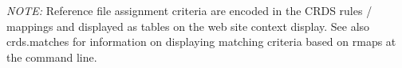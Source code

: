 \documentclass[letterpaper,10pt,english]{sphinxmanual}
\begin{document}
\emph{NOTE:} Reference file assignment criteria are encoded in the CRDS rules / mappings and displayed as tables on
the web site context display.   See also crds.matches for information on displaying matching criteria based on rmaps
at the command line.



\renewcommand{\indexname}{Index}
\printindex
\end{document}
